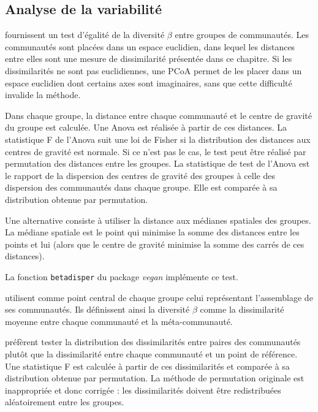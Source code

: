 \documentclass[
  11pt,
  french,
  a4paper,
  extrafontsizes,onecolumn,openright
  ]{memoir}
\begin{document}
\hypertarget{analyse-de-la-variabilituxe9}{%
\subsection{Analyse de la variabilité}\label{analyse-de-la-variabilituxe9}}

\textcite{Anderson2006} fournissent un test d'égalité de la diversité \(\beta\) entre groupes de communautés.
Les communautés sont placées dans un espace euclidien, dans lequel les distances entre elles sont une mesure de dissimilarité présentée dans ce chapitre.
Si les dissimilarités ne sont pas euclidiennes, une PCoA permet de les placer dans un espace euclidien dont certains axes sont imaginaires, sans que cette difficulté invalide la méthode.

Dans chaque groupe, la distance entre chaque communauté et le centre de gravité du groupe est calculée.
Une Anova est réalisée à partir de ces distances.
La statistique F de l'Anova suit une loi de Fisher si la distribution des distances aux centres de gravité est normale.
Si ce n'est pas le cas, le test peut être réalisé par permutation des distances entre les groupes.
La statistique de test de l'Anova est le rapport de la dispersion des centres de gravité des groupes à celle des dispersion des communautés dans chaque groupe.
Elle est comparée à sa distribution obtenue par permutation.

Une alternative consiste à utiliser la distance aux médianes spatiales des groupes.
La médiane spatiale est le point qui minimise la somme des distances entre les points et lui (alors que le centre de gravité minimise la somme des carrés de ces distances).

La fonction \texttt{betadisper} du package \emph{vegan} implémente ce test.

\textcite{Ricotta2009a} utilisent comme point central de chaque groupe celui représentant l'assemblage de ses communautés.
Ils définissent ainsi la diversité \(\beta\) comme la dissimilarité moyenne entre chaque communauté et la méta-communauté.

\textcite{Bacaro2012} préfèrent tester la distribution des dissimilarités entre paires des communautés plutôt que la dissimilarité entre chaque communauté et un point de référence.
Une statistique F est calculée à partir de ces dissimilarités et comparée à sa distribution obtenue par permutation.
La méthode de permutation originale est inappropriée et donc corrigée \autocite{Bacaro2013a}: les dissimilarités doivent être redistribuées aléatoirement entre les groupes.
\end{document}
